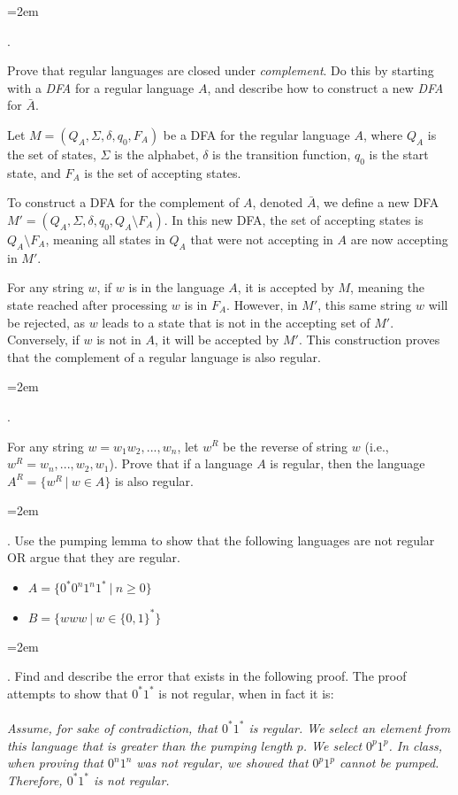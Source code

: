 \documentclass[12pt]{article}
\newcounter{quesnum}
\newcommand{\question}[2][??]{
\begin{list}{\labelitemi}{\leftmargin=2em}
\item [\arabic{quesnum}.] {} {#2}
\end{list}
\addtocounter{quesnum}{1}
}
\begin{document}

\vspace{12pt}

\question[3]{
Prove that regular languages are closed under \emph{complement}. Do this by starting with a \emph{DFA} for a regular language $A$, and describe how to construct a new \emph{DFA} for $\bar{A}$.

Let $M = (Q_A, \Sigma, \delta, q_0, F_A)$ be a DFA for the regular language $A$, where $Q_A$ is the set of states, $\Sigma$ is the alphabet, $\delta$ is the transition function, $q_0$ is the start state, and $F_A$ is the set of accepting states.

To construct a DFA for the complement of $A$, denoted $\bar{A}$, we define a new DFA $M' = (Q_A, \Sigma, \delta, q_0, Q_A \setminus F_A)$. In this new DFA, the set of accepting states is $Q_A \setminus F_A$, meaning all states in $Q_A$ that were not accepting in $A$ are now accepting in $M'$.

For any string $w$, if $w$ is in the language $A$, it is accepted by $M$, meaning the state reached after processing $w$ is in $F_A$. However, in $M'$, this same string $w$ will be rejected, as $w$ leads to a state that is not in the accepting set of $M'$. Conversely, if $w$ is not in $A$, it will be accepted by $M'$. This construction proves that the complement of a regular language is also regular.



}

\vspace{12pt}

\question[3]{
For any string $w = w_1w_2,...,w_n$, let $w^R$ be the reverse of string $w$ (i.e., $w^R=w_n,...,w_2,w_1$). Prove that if a language $A$ is regular, then the language $A^R = \{w^R \ | \ w \in A\}$ is also regular.


}


\vspace{12pt}

\question[3]{
Use the pumping lemma to show that the following languages are not regular OR argue that they are regular. 
}

\begin{itemize}
	\item $A= \{ 0^*0^n1^n1^* \ | \ n \geq 0\}$
	\item $B= \{ www \ | \ w \in \{0,1\}^* \}$
\end{itemize}

\vspace{12pt}

\question[3]{
Find and describe the error that exists in the following proof. The proof attempts to show that $0^*1^*$ is not regular, when in fact it is:
\\
\\
\emph{
Assume, for sake of contradiction, that $0^*1^*$ is regular. We select an element from this language that is greater than the pumping length $p$. We select $0^p1^p$. In class, when proving that $0^n1^n$ was not regular, we showed that $0^p1^p$ cannot be pumped. Therefore, $0^*1^*$ is not regular.
}
}

\vspace{12pt}
\end{document}
